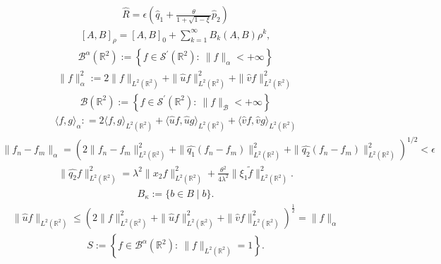 \begin{align*} \widehat{R} = \epsilon \left( \widehat{q}_1 + \frac{\theta}{1+ \sqrt{1- \xi}} \widehat{p}_2 \right)\end{align*}
\begin{align*}\left[A, B \right]_{\rho} =\left[A, B \right]_0+ \sum_{k=1}^{\infty} B_k (A,B) \rho^k,\end{align*}
\begin{align*}\mathcal{B}^{\alpha} (\mathbb{R}^2) := \left\{f \in \mathcal{S}^{\prime} (\mathbb{R}^2): ~ \|f \|_{\alpha} < + \infty \right\}\end{align*}
\begin{align*}\|f \|_{\alpha}^2 := 2 \|f \|_{L^2 (\mathbb{R}^2)} + \|\widehat{u} f\|_{L^2 (\mathbb{R}^2)}^2 + \|\widehat{v} f\|_{L^2 (\mathbb{R}^2)}^2\end{align*}
\begin{align*}\mathcal{B} (\mathbb{R}^2) := \left\{f \in \mathcal{S}^{\prime} (\mathbb{R}^2): ~ \|f \|_{\mathcal{B}} < + \infty \right\}\end{align*}
\begin{align*}\langle f,g \rangle_{\alpha} : = 2 \langle f,g \rangle_{L^2 (\mathbb{R}^2)} + \langle \widehat{u}f,\widehat{u}g \rangle_{L^2 (\mathbb{R}^2)} + \langle \widehat{v}f,\widehat{v}g \rangle_{L^2 (\mathbb{R}^2)}\end{align*}
\begin{align*}\|f_n-f_m\|_{\alpha} = \left( 2\|f_n-f_m\|_{L^2 (\mathbb{R}^2)}^2 + \|\widehat{q_1}(f_n-f_m)\|_{L^2 (\mathbb{R}^2)}^2 + \|\widehat{q_2}(f_n-f_m)\|_{L^2 (\mathbb{R}^2)}^2 \right)^{1/2} < \epsilon\end{align*}
\begin{align*}\|\widehat{q_2}f\|_{L^2 (\mathbb{R}^2)}^2 = \lambda^2 \|x_2 f\|_{L^2 (\mathbb{R}^2)}^2 + \frac{\theta^2}{4 \lambda^2} \| \xi_1 \widetilde{f}\|_{L^2 (\mathbb{R}^2)}^2.\end{align*}
\begin{align*}B_\kappa := \{b \in B \mid b \}.\end{align*}
\begin{align*}\|\widehat{u} f \|_{L^2 (\mathbb{R}^2)} \leq \left( 2 \| f \|_{L^2 (\mathbb{R}^2)}^2 + \|\widehat{u} f \|_{L^2 (\mathbb{R}^2)}^2 + \|\widehat{v} f\|_{L^2 (\mathbb{R}^2)}^2\right)^{\frac{1}{2}} = \| f \|_{\alpha}\end{align*}
\begin{align*}S:= \left\{f \in \mathcal{B}^{\alpha} (\mathbb{R}^2): ~ \| f \|_{L^2 (\mathbb{R}^2)} =1 \right\}.\end{align*}
